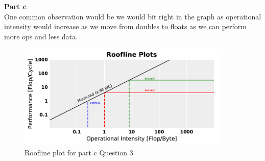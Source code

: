 \documentclass[letterpaper, 11pt]{article}
\begin{document}
\textbf{Part c} \\ 
One common observation would be we would bit right in the graph as operational intensity would increase as we move from doubles to floats as we can perform more ops and less data.
\begin{figure}[h!]
	\centering
    \includegraphics[width=100mm]{part3}
    \caption{Roofline plot for part c Question 3}
\end{figure}
\end{document}
